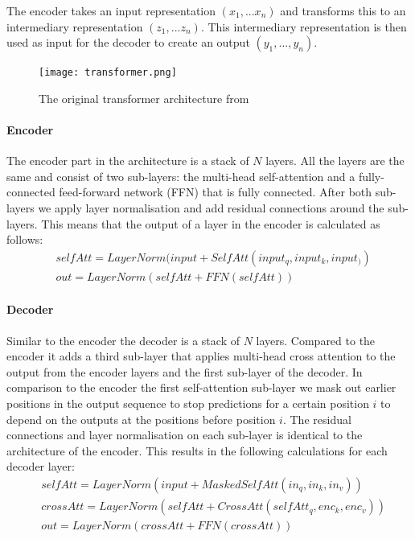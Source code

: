 The encoder takes an input representation $(x_1,...x_n)$ and transforms this to an intermediary representation $(z_1,...z_n)$. This intermediary representation is then used as input for the decoder to create an output $(y_1,...,y_n)$.

\begin{figure}[h]
\caption{The original transformer architecture from \cite{vaswani_attention_2017}}
\centering
\texttt{[image: transformer.png]}
\label{fig:prelim:transformer-architecture}
\end{figure}

\paragraph{Encoder}
The encoder part in the architecture is a stack of $N$ layers. All the layers are the same and consist of two sub-layers: the multi-head self-attention and a fully-connected feed-forward network (FFN) that is fully connected. After both sub-layers we apply layer normalisation\cite{ba_layer_2016} and add residual connections\cite{he_deep_2015} around the sub-layers. This means that the output of a layer in the encoder is calculated as follows: 
\begin{align}
&selfAtt = LayerNorm(input + SelfAtt(input_q, input_k, input_))\\
&out = LayerNorm(selfAtt + FFN(selfAtt))
\end{align}


\paragraph{Decoder}
Similar to the encoder the decoder is a stack of $N$ layers. Compared to the encoder it adds a third sub-layer that applies multi-head cross attention to the output from the encoder layers and the first sub-layer of the decoder. In comparison to the encoder the first self-attention sub-layer we mask out earlier positions in the output sequence to stop predictions for a certain position $i$ to depend on the outputs at the positions before position $i$. The residual connections and layer normalisation on each sub-layer is identical to the architecture of the encoder. This results in the following calculations for each decoder layer: 
\begin{align}
&selfAtt = LayerNorm(input + MaskedSelfAtt(in_q, in_k, in_v))\\
&crossAtt = LayerNorm(selfAtt + CrossAtt(selfAtt_q, enc_k, enc_v))\\
&out = LayerNorm(crossAtt + FFN(crossAtt))
\end{align}

